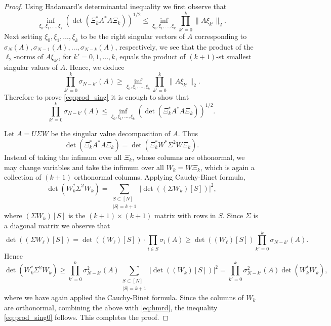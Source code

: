 \documentclass{amsart}
\numberwithin{equation}{section}
\def\corAB{}
\def\corOZ{}
\newcommand{\abbr}[1]{{\sc\lowercase{#1}}}
\begin{document}
\begin{proof}
  \corAB{Using Hadamard's} \corOZ{determinantal inequality} \corAB{we first observe that
\[
\inf_{\xi_0,\xi_1,\ldots,\xi_k}\left(\det(\Xi_k^* A^* A \Xi_k)\right)^{1/2} \le   \inf_{\xi_0,\xi_1,\ldots,\xi_k}\prod_{k'=0}^k
  \| A \xi_{k'}\|_2.
\]
Next setting $\xi_0,\xi_1,\ldots,\xi_k$ to be the right singular vectors of $A$ corresponding to $\sigma_N(A), \sigma_{N-1}(A), \ldots, \sigma_{N-k}(A)$, respectively, we see that the product of the $\ell_2$-norms of $A\xi_{k'}$, for $k'=0,1,\ldots,k$, equals the product of $(k+1)$-st smallest singular values of $A$. Hence, we deduce
\[
\prod_{k'=0}^k \sigma_{N-k'}(A)  \ge \inf_{\xi_0,\xi_1,\ldots,\xi_k}\prod_{k'=0}^k  \| A \xi_{k'}\|_2.
\]}\corAB{
Therefore to prove \eqref{eq:prod_sing} it is enough to show that
\begin{equation}\label{eq:prod_sing0}
\prod_{k'=0}^k \sigma_{N-k'}(A) \le \inf_{\xi_0,\xi_1,\ldots,\xi_k}\left(\det(\Xi_k^* A^* A \Xi_k)\right)^{1/2}.
\end{equation}}

  Let $A = U\Sigma W$ be the singular value decomposition of $A$. %
  Thus
  \begin{equation}
    \label{eq:hmrd}
    \det( \Xi_k^* \corAB{A^* A} \Xi_k)
    =
    \det( \Xi_k^* W^* \Sigma^2 W \Xi_k).
  \end{equation}
  \corAB{Instead of} taking the infimum over all $\Xi_k$, \corAB{whose columns are othonormal}, we may change variables and take the infimum over all $W_k= W \Xi_k$, which is again a collection of $(k+1)$ orthonormal columns.
  Applying Cauchy-Binet \corAB{formula},
  \[
    \det(W_k^* \Sigma^2 W_k)
    =
    \sum_{\substack{S \subset [N] \\ |S| =k+1 }}
    |\det((\Sigma W_k)[S])|^2,
  \]
  where $(\Sigma W_k)[S]$ is the $(k+1)\times (k+1)$ matrix with rows in $S.$  \corAB{Since $\Sigma$ is a diagonal matrix we} observe that
  \[
    \det((\Sigma W_\ell)[S])
    =
    \det((W_\ell)[S])\cdot \prod_{i \in S} \sigma_i(A)
    \geq
    \det((W_\ell)[S]) \prod_{k'=0}^k \sigma_{N-k'}(A).
  \]
  Hence
  \[
    \det(W_k^* \Sigma^2 W_k)
    \geq
    \prod_{k'=0}^k \sigma_{N-k'}^2(A)
    \sum_{\substack{S \subset [N] \\ |S| =k+1 }}|\det((W_k)[S])|^2
    =
    \prod_{k'=0}^k \sigma_{N-k'}^2(A) \det(W_k^*W_k),
  \]
  where we have again applied \corAB{the} Cauchy-Binet \corAB{formula}. \corAB{Since the columns of $W_k$ are orthonormal, combining the above with \eqref{eq:hmrd}, the inequality \eqref{eq:prod_sing0} follows. This completes the proof.} %
\end{proof}
\end{document}
